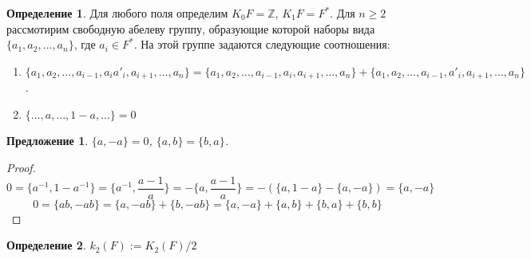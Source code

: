 \documentclass{article}
\newtheorem*{proposition}{Предложение}
\theoremstyle{definition}
\newtheorem*{definition}{Определение}
\theoremstyle{remark}
\newcommand{\Z}{\mathbb{Z}}
\begin{document}
\begin{definition}
    Для любого поля определим $K_0F = \Z$, $K_1 F = F^*$. Для $n \geq 2$ рассмотирим свободную абелеву группу, образующие которой наборы вида $\{a_1, a_2, \ldots, a_n\}$, где $a_i \in F^*$. На этой группе задаются следующие соотношения:
    \begin{enumerate}[wide, label = \arabic*)]
        \item $\{a_1, a_2, \ldots, a_{i-1}, a_ia'_i, a_{i + 1}, \ldots, a_n\} = \{a_1, a_2, \ldots, a_{i - 1}, a_i, a_{i + 1}, \ldots, a_n\} + \{a_1, a_2, \ldots, a_{i - 1}, a'_i, a_{i + 1}, \ldots, a_n\}$.
        \item $\{\ldots, a, \ldots, 1 - a, \ldots\} = 0$
    \end{enumerate}
\end{definition}

\begin{proposition}
    $\{a, -a\} = 0$, $\{a, b\} = \{b, a\}$.
\end{proposition}
\begin{proof}
    $$0 = \{a^{-1}, 1 - a^{-1}\} = \{a^{-1}, \frac{a - 1}{a}\} = -\{a, \frac{a - 1}{a}\} = -(\{a, 1 - a\} - \{a, -a\}) = \{a, -a\}$$
    $$0 = \{ab, -ab\} = \{a, -ab\} + \{b, -ab\} = \{a, -a\} + \{a, b\} + \{b, a\} + \{b, b\}$$
\end{proof}

\begin{definition}
    $k_2(F) := K_2(F) / 2$
\end{definition}
\end{document}
